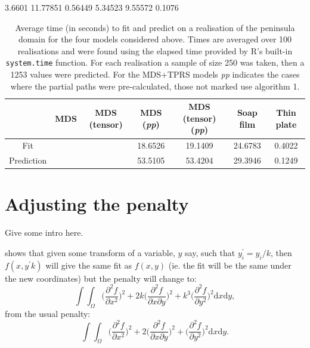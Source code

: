 \documentclass[a4paper,10pt]{article}
\begin{document}
3.6601 
11.77851 
0.56449 
5.34523 
9.55572 
0.1076 




\begin{table}[ht]
\centering
\begin{tabular}{c || c c c c c c}
 & MDS & MDS (tensor) & MDS (\textit{pp})& MDS (tensor) (\textit{pp})& Soap film & Thin plate\\ 
\hline
Fit & & & 18.6526 & 19.1409 & 24.6783 & 0.4022\\ 
Prediction & & & 53.5105 & 53.4204 & 29.3946 & 0.1249\\
\end{tabular}
\label{wt2time}
\caption{Average time (in seconds) to fit and predict on a realisation of the peninsula domain for the four models considered above. Times are averaged over 100 realisations and were found using the elapsed time provided by \textsf{R}'s built-in \texttt{system.time} function. For each realisation a sample of size 250 was taken, then a 1253 values were predicted. For the MDS+TPRS models \textit{pp} indicates the cases where the partial paths were pre-calculated, those not marked use algorithm 1.}
\end{table}





\section{Adjusting the penalty}

Give some intro here.

\cite{wood2000} shows that given some transform of a variable, $y$ say, such that $y_i^\prime=y_i/k$, then $f(x,y^\prime k)$ will give the same fit as $f(x,y)$ (ie. the fit will be the same under the new coordinates) but the penalty will change to:
\begin{equation}
\int\int_\Omega \Big( \frac{\partial^2 f}{\partial x^2} \Big)^2 + 2k\Big( \frac{\partial^2 f}{\partial x \partial y} \Big)^2 + k^3\Big( \frac{\partial^2 f}{\partial y^2} \Big)^2 \text{d}x \text{d}y,
\label{adjustedintegral}
\end{equation}
from the usual penalty:
\begin{equation*}
\int\int_\Omega \Big( \frac{\partial^2 f}{\partial x^2} \Big)^2 + 2\Big( \frac{\partial^2 f}{\partial x \partial y} \Big)^2 + \Big( \frac{\partial^2 f}{\partial y^2} \Big)^2 \text{d}x \text{d}y.
\end{equation*}
\end{document}
